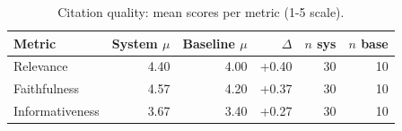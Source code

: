 \begin{table}[htbp]
\centering
\caption{Citation quality: mean scores per metric (1-5 scale).}
\label{tab:citation_quality}
\small
\begin{tabular}{lrrrrr}
\toprule
Metric & System $\mu$ & Baseline $\mu$ & $\Delta$ & $n$ sys & $n$ base \\
\midrule
Relevance & 4.40 & 4.00 & +0.40 & 30 & 10 \\
Faithfulness & 4.57 & 4.20 & +0.37 & 30 & 10 \\
Informativeness & 3.67 & 3.40 & +0.27 & 30 & 10 \\
\bottomrule
\end{tabular}
\end{table}